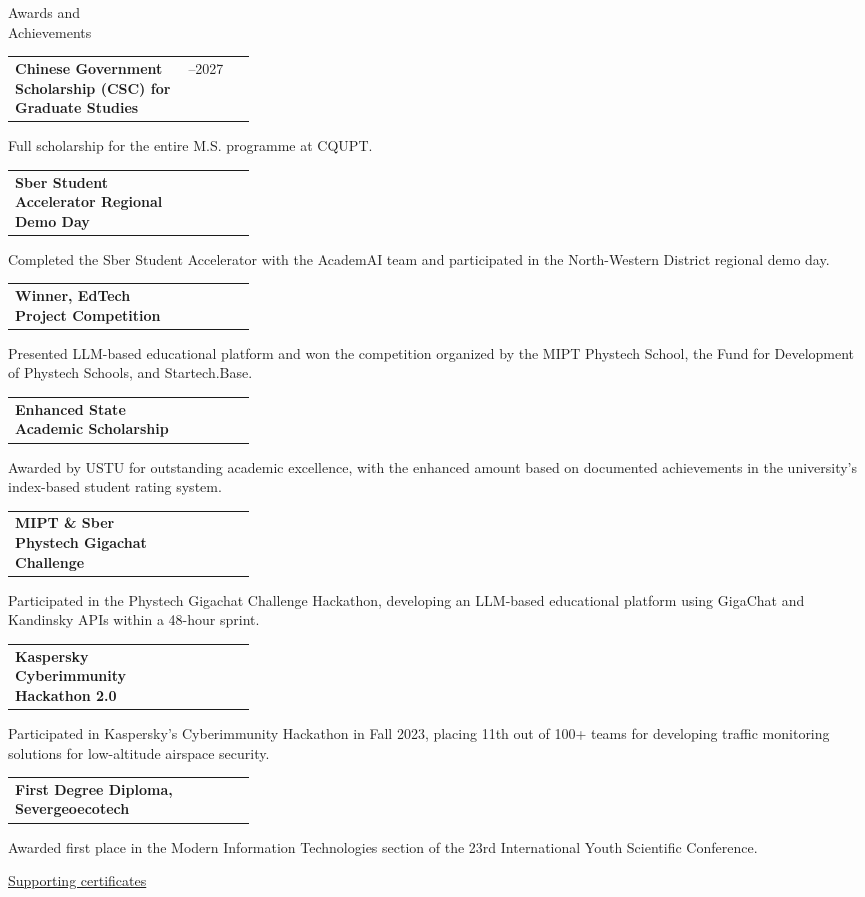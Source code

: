 \documentclass[11pt,a4paper]{article}
\makeatletter
\newcommand{\cvrow}[2]{%
  \noindent
  \begin{minipage}[t]{0.145\textwidth}
    \vspace{0pt}%
    \raggedright
    \fontsize{10.5}{12.5}\selectfont
    #1
  \end{minipage}%
  \hfill
  \begin{minipage}[t]{0.835\textwidth}
    \vspace{0pt}%
    #2
  \end{minipage}\par
}
\newcommand{\entry}[2]{%
  \begin{tabularx}{\linewidth}{@{}X >{\raggedleft\arraybackslash}p{0.28\linewidth}@{}}
    #1 & #2
  \end{tabularx}
}
\makeatother
\begin{document}
\vspace{0.75em}

\cvrow{Awards and\\Achievements}{%
  \entry
    {\textbf{Chinese Government Scholarship (CSC) for Graduate Studies}}
    {2024--2027}
  Full scholarship for the entire M.S. programme at CQUPT.

  \vspace{0.45em}
  \entry
    {\textbf{Sber Student Accelerator Regional Demo Day}}
    {2023}
  Completed the Sber Student Accelerator with the AcademAI team and
  participated in the North-Western District regional demo day.

  \vspace{0.45em}
  \entry
    {\textbf{Winner, EdTech Project Competition}}
    {2023}
  Presented LLM-based educational platform and won the competition organized
  by the MIPT Phystech School, the Fund for Development of Phystech Schools,
  and Startech.Base.

  \vspace{0.45em}
  \entry
    {\textbf{Enhanced State Academic Scholarship}}
    {2023}
  Awarded by USTU for outstanding academic excellence, with the enhanced amount
  based on documented achievements in the university's index-based student rating system.

  \vspace{0.45em}
  \entry
    {\textbf{MIPT \& Sber Phystech Gigachat Challenge}}
    {2023}
  Participated in the Phystech Gigachat Challenge Hackathon, developing
  an LLM-based educational platform using GigaChat and Kandinsky APIs
  within a 48-hour sprint.

  \vspace{0.45em}
  \entry{\textbf{Kaspersky Cyberimmunity Hackathon 2.0}}
  {2023}
  Participated in Kaspersky’s Cyberimmunity Hackathon in Fall 2023,
  placing 11th out of 100+ teams for developing traffic monitoring
  solutions for low-altitude airspace security.

  \vspace{0.45em}
  \entry
    {\textbf{First Degree Diploma, Severgeoecotech}}
    {2022}
  Awarded first place in the Modern Information Technologies section of the
  23rd International Youth Scientific Conference.

  \vspace{0.3em}
  \href{https://iasenovets.github.io/files/certificates_selected_en_public_ready_v2.pdf}
       {\small Supporting certificates}
}

\vspace{0.50em}
\end{document}
